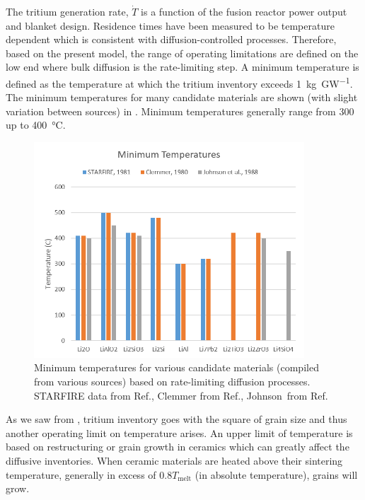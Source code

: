 The tritium generation rate, $\dot{T}$ is a function of the fusion reactor power output and blanket design. Residence times have been measured to be temperature dependent which is consistent with diffusion-controlled processes. Therefore, based on the present model, the range of operating limitations are defined on the low end where bulk diffusion is the rate-limiting step. A minimum temperature is defined as the temperature at which the tritium inventory exceeds \SI{1}{\kilo\gram\per\giga\watt}. The minimum temperatures for many candidate materials are shown (with slight variation between sources) in . Minimum temperatures generally range from 300 up to \SI{400}{\celsius}.

\begin{figure}[ht]
	\centering
	\includegraphics[width=0.9\textwidth]{figures/Tmin} 
	\caption{Minimum temperatures for various candidate materials (compiled from various sources) based on rate-limiting diffusion processes. STARFIRE data from Ref.\cite{Johnson1981}, Clemmer from Ref.\cite{Clemmer1980}, Johnson\etal~from Ref.\cite{Johnson1988}}
	\label{fig:Tmin}
\end{figure}

As we saw from , tritium inventory goes with the square of grain size and thus another operating limit on temperature arises. An upper limit of temperature is based on restructuring or grain growth in ceramics which can greatly affect the diffusive inventories. When ceramic materials are heated above their sintering temperature, generally in excess of $0.8 T_\text{melt}$ (in absolute temperature), grains will grow. 


